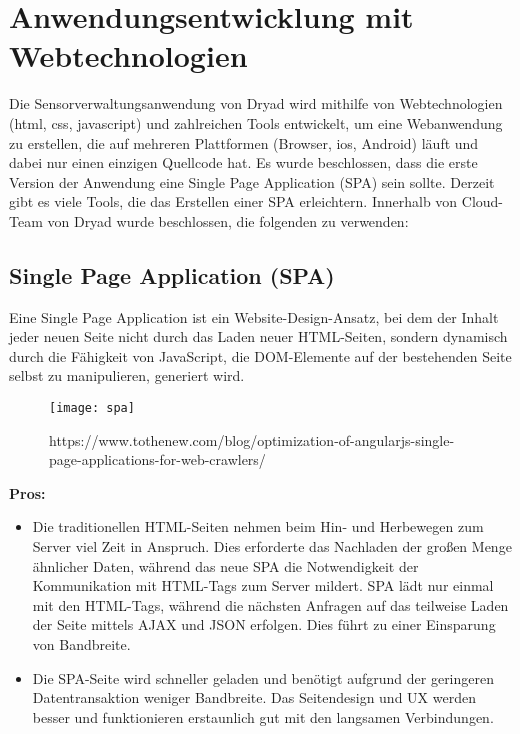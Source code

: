 \section{Anwendungsentwicklung mit Webtechnologien}

Die Sensorverwaltungsanwendung von Dryad wird mithilfe von Webtechnologien (html, css, javascript) und zahlreichen Tools entwickelt, um eine Webanwendung zu erstellen, die auf mehreren Plattformen (Browser, ios, Android) läuft und dabei nur einen einzigen Quellcode hat.
Es wurde beschlossen, dass die erste Version der Anwendung eine Single Page Application (SPA) sein sollte.
Derzeit gibt es viele Tools, die das Erstellen einer SPA erleichtern. Innerhalb von Cloud-Team von Dryad wurde beschlossen, die folgenden zu verwenden:

\subsection{Single Page Application (SPA)}

Eine Single Page Application ist ein Website-Design-Ansatz, bei dem der Inhalt jeder neuen Seite nicht durch das Laden neuer HTML-Seiten, sondern dynamisch durch die Fähigkeit von JavaScript, die \ac{DOM}-Elemente auf der bestehenden Seite selbst zu manipulieren, generiert wird.

\begin{figure}[h]
  \centering
  \texttt{[image: spa]}
  \caption{https://www.tothenew.com/blog/optimization-of-angularjs-single-page-applications-for-web-crawlers/}
  \label{fig:spa}
\end{figure}

\textbf{Pros:}

\begin{itemize}
  \item Die traditionellen HTML-Seiten nehmen beim Hin- und Herbewegen zum Server viel Zeit in Anspruch. Dies erforderte das Nachladen der großen Menge ähnlicher Daten, während das neue SPA die Notwendigkeit der Kommunikation mit HTML-Tags zum Server mildert. SPA lädt nur einmal mit den HTML-Tags, während die nächsten Anfragen auf das teilweise Laden der Seite mittels AJAX und JSON erfolgen. Dies führt zu einer Einsparung von Bandbreite.
  \item Die SPA-Seite wird schneller geladen und benötigt aufgrund der geringeren Datentransaktion weniger Bandbreite. Das Seitendesign und UX werden besser und funktionieren erstaunlich gut mit den langsamen Verbindungen.
\end{itemize}


